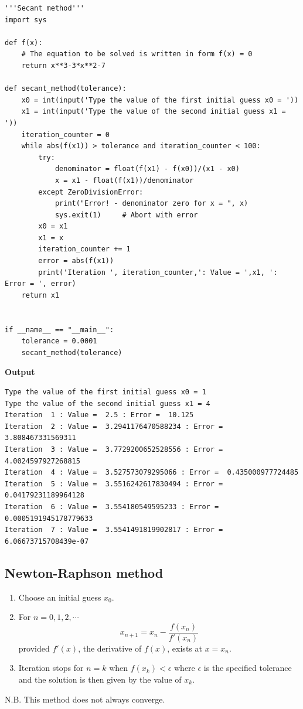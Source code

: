 \documentclass[a4paper,11pt]{book}
\begin{document}
\begin{lstlisting}
'''Secant method'''
import sys

def f(x):
    # The equation to be solved is written in form f(x) = 0
    return x**3-3*x**2-7

def secant_method(tolerance):
    x0 = int(input('Type the value of the first initial guess x0 = '))
    x1 = int(input('Type the value of the second initial guess x1 = '))
    iteration_counter = 0
    while abs(f(x1)) > tolerance and iteration_counter < 100:
        try:
            denominator = float(f(x1) - f(x0))/(x1 - x0)
            x = x1 - float(f(x1))/denominator
        except ZeroDivisionError:
            print("Error! - denominator zero for x = ", x)
            sys.exit(1)     # Abort with error
        x0 = x1
        x1 = x
        iteration_counter += 1
        error = abs(f(x1))
        print('Iteration ', iteration_counter,': Value = ',x1, ': Error = ', error)
    return x1


if __name__ == "__main__":
    tolerance = 0.0001
    secant_method(tolerance)
\end{lstlisting}
\textbf{Output}
\begin{lstlisting}
Type the value of the first initial guess x0 = 1
Type the value of the second initial guess x1 = 4
Iteration  1 : Value =  2.5 : Error =  10.125
Iteration  2 : Value =  3.2941176470588234 : Error =  3.808467331569311
Iteration  3 : Value =  3.7729200652528556 : Error =  4.0024597927268815
Iteration  4 : Value =  3.527573079295066 : Error =  0.435000977724485
Iteration  5 : Value =  3.5516242617830494 : Error =  0.04179231189964128
Iteration  6 : Value =  3.554180549595233 : Error =  0.0005191945178779633
Iteration  7 : Value =  3.5541491819902817 : Error =  6.06673715708439e-07
\end{lstlisting}

\subsection{Newton-Raphson method}
\begin{enumerate}
    \item Choose an initial guess $x_0$.
    \item For $n = 0,1,2, \cdots $
    $$x_{n+1} = x_n - \dfrac{f(x_n)}{f'(x_n)}$$
    provided $f'(x)$, the derivative of $f(x)$, exists at $x=x_n$.
    \item Iteration stops for $n=k$ when $f(x_k) < \epsilon$ where $\epsilon$ is the specified tolerance and the solution is then given by the value of $x_k$.
\end{enumerate}
\noindent N.B. This method does not always converge.
\vspace{5mm}
\end{document}
